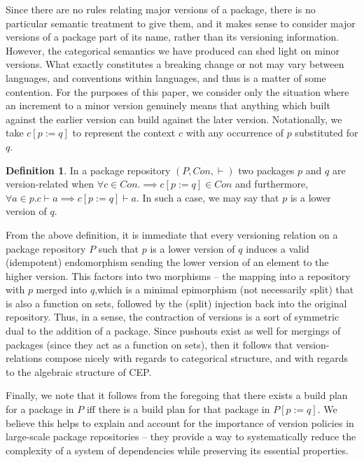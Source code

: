 \documentclass[hoptionsi,review,screen,format=sigconf]{acmart}
\theoremstyle{definition}
\newtheorem{definition}{Definition}[section]
\begin{document}
Since there are no rules relating major versions of a package, there is no particular semantic treatment to give them, and it makes sense to consider major versions of a package part of its name, rather than its versioning information. However, the categorical semantics we have produced can shed light on minor versions. What exactly constitutes a breaking change or not may vary between languages, and conventions within languages, and thus is a matter of some contention. For the purposes of this paper, we consider only the situation where an increment to a minor version genuinely means that anything which built against the earlier version can build against the later version. Notationally, we take \(c[p := q]\) to represent the context \(c\) with any occurrence of \(p\) substituted for \(q\).

\begin{definition}
In a package repository \((P, Con, \vdash)\)  two packages \(p\) and \(q\) are version-related when \(\forall c \in Con. \implies c[p := q] \in Con\) and furthermore, \(\forall a \in p. c \vdash a \implies c[p := q] \vdash a\). In such a case, we may say that \(p\) is a lower version of \(q\).
\end{definition}

From the above definition, it is immediate that every versioning relation on a package repository \(P\) such that \(p\) is a lower version of \(q\) induces a valid (idempotent) endomorphism sending the lower version of an element to the higher version. This factors into two morphisms -- the mapping into a repository with \(p\) merged into \(q\),which is a minimal epimorphism (not necessarily split) that is also a function on sets, followed by the (split) injection back into the original repository. Thus, in a sense, the contraction of versions is a sort of symmetric dual to the addition of a package. Since pushouts exist as well for mergings of packages (since they act as a function on sets), then it follows that version-relations compose nicely with regards to categorical structure, and with regards to the algebraic structure of CEP.

Finally, we note that it follows from the foregoing that there exists a build plan for a package in \(P\) iff there is a build plan for that package in \(P[p:=q]\). We believe this helps to explain and account for the importance of version policies in large-scale package repositories -- they provide a way to systematically reduce the complexity of a system of dependencies while preserving its essential properties.
\end{document}
